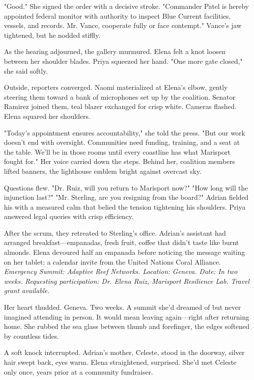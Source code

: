 "Good." She signed the order with a decisive stroke. "Commander Patel is hereby appointed federal monitor with authority to inspect Blue Current facilities, vessels, and records. Mr. Vance, cooperate fully or face contempt." Vance's jaw tightened, but he nodded stiffly.

As the hearing adjourned, the gallery murmured. Elena felt a knot loosen between her shoulder blades. Priya squeezed her hand. "One more gate closed," she said softly.

Outside, reporters converged. Naomi materialized at Elena's elbow, gently steering them toward a bank of microphones set up by the coalition. Senator Ramirez joined them, teal blazer exchanged for crisp white. Cameras flashed. Elena squared her shoulders.

"Today's appointment ensures accountability," she told the press. "But our work doesn't end with oversight. Communities need funding, training, and a seat at the table. We'll be in those rooms until every coastline has what Marisport fought for." Her voice carried down the steps. Behind her, coalition members lifted banners, the lighthouse emblem bright against overcast sky.

Questions flew. "Dr. Ruiz, will you return to Marisport now?" "How long will the injunction last?" "Mr. Sterling, are you resigning from the board?" Adrian fielded his with a measured calm that belied the tension tightening his shoulders. Priya answered legal queries with crisp efficiency.

After the scrum, they retreated to Sterling's office. Adrian's assistant had arranged breakfast—empanadas, fresh fruit, coffee that didn't taste like burnt almonds. Elena devoured half an empanada before noticing the message waiting on her tablet: a calendar invite from the United Nations Coral Alliance. \textit{Emergency Summit: Adaptive Reef Networks. Location: Geneva. Date: In two weeks. Requesting participation: Dr. Elena Ruiz, Marisport Resilience Lab. Travel grant available.}

Her heart thudded. Geneva. Two weeks. A summit she'd dreamed of but never imagined attending in person. It would mean leaving again—right after returning home. She rubbed the sea glass between thumb and forefinger, the edges softened by countless tides.

A soft knock interrupted. Adrian's mother, Celeste, stood in the doorway, silver hair swept back, eyes warm. Elena straightened, surprised. She'd met Celeste only once, years prior at a community fundraiser.

